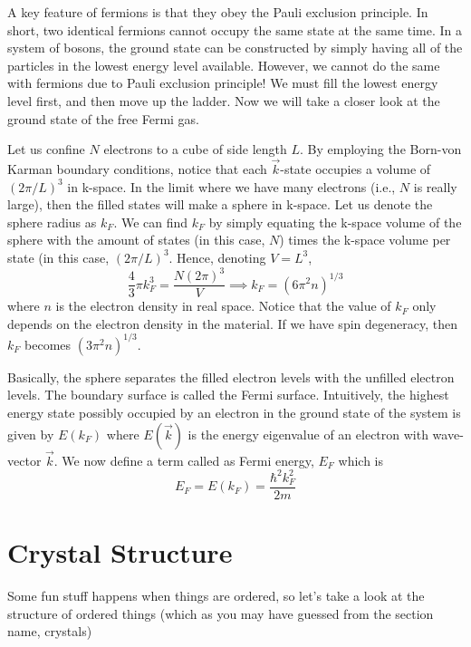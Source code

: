 \documentclass[12pt]{article}
\begin{document}
\vspace{0.25in}

A key feature of fermions is that they obey the Pauli exclusion principle. In short, two identical fermions cannot occupy the same state at the same time. In a system of bosons, the ground state can be constructed by simply having all of the particles in the lowest energy level available. However, we cannot do the same with fermions due to Pauli exclusion principle! We must fill the lowest energy level first, and then move up the ladder. Now we will take a closer look at the ground state of the free Fermi gas.

\vspace{0.25in}

Let us confine $N$ electrons to a cube of side length $L$. By employing the Born-von Karman boundary conditions, notice that each $\vec{k}$-state occupies a volume of $(2\pi/L)^3$ in k-space. In the limit where we have many electrons (i.e., $N$ is really large), then the filled states will make a sphere in k-space. Let us denote the sphere radius as $k_F$. We can find $k_F$ by simply equating the k-space volume of the sphere with the amount of states (in this case, $N$) times the k-space volume per state (in this case, $(2\pi/L)^3$. Hence, denoting $V=L^3$,
\begin{equation*}
    \frac{4}{3}\pi k_F^3=\frac{N(2\pi)^3}{V}\implies k_F=(6\pi^2n)^{1/3}
\end{equation*}
where $n$ is the electron density in real space. Notice that the value of $k_F$ only depends on the electron density in the material. If we have spin degeneracy, then $k_F$ becomes $(3\pi^2n)^{1/3}$.

\vspace{0.25in}

Basically, the sphere separates the filled electron levels with the unfilled electron levels. The boundary surface is called the Fermi surface. Intuitively, the highest energy state possibly occupied by an electron in the ground state of the system is given by $E(k_F)$ where $E(\vec{k})$ is the energy eigenvalue of an electron with wave-vector $\vec{k}$. We now define a term called as Fermi energy, $E_F$ which is
\begin{equation*}
    E_F=E(k_F)=\frac{\hbar^2k_F^2}{2m}
\end{equation*}

\vspace{0.25in}

\newpage


\section{Crystal Structure}
Some fun stuff happens when things are ordered, so let's take a look at the structure of ordered things (which as you may have guessed from the section name, crystals)
\end{document}
